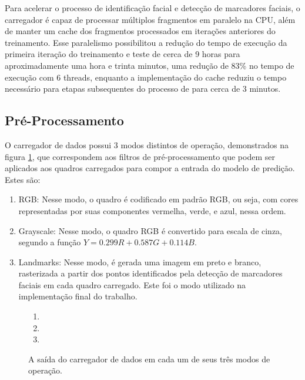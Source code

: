Para acelerar o processo de identificação facial e detecção de marcadores faciais, o carregador é capaz de processar múltiplos fragmentos em paralelo na CPU, além de manter um cache dos fragmentos processados em iterações anteriores do treinamento.
Esse paralelismo possibilitou a redução do tempo de execução da primeira iteração do treinamento e teste de cerca de 9 horas para aproximadamente uma hora e trinta minutos, uma redução de 83\% no tempo de execução com 6 threads, enquanto a implementação do cache reduziu o tempo necessário para etapas subsequentes do processo de para cerca de 3 minutos.

\subsection{Pré-Processamento}
\label{sec:pre-processing}

O carregador de dados possui 3 modos distintos de operação, demonstrados na figura \ref{fig:generator_out}, que correspondem aos filtros de pré-processamento que podem ser aplicados aos quadros carregados para compor a entrada do modelo de predição. Estes são:

\begin{enumerate}[label={(\arabic*)}]
    \item RGB: Nesse modo, o quadro é codificado em padrão RGB, ou seja, com cores representadas por suas componentes vermelha, verde, e azul, nessa ordem.
    \item Grayscale: Nesse modo, o quadro RGB é convertido para escala de cinza, segundo a função $Y = 0.299 R + 0.587 G + 0.114 B$.
    \item Landmarks: Nesse modo, é gerada uma imagem em preto e branco, rasterizada a partir dos pontos identificados pela detecção de marcadores faciais em cada quadro carregado. Este foi o modo utilizado na implementação final do trabalho.
\end{enumerate}

\begin{figure}[ht]
    \centering
    \begin{enumerate}[label={(\arabic*)}]
        \item \parbox{\linewidth}{\centering
            
        }
        \item \parbox{\linewidth}{\centering
            
        }
        \item \parbox{\linewidth}{\centering
            
        }
    \end{enumerate}
    \caption{A saída do carregador de dados em cada um de seus três modos de operação.}
    \label{fig:generator_out}
\end{figure}

